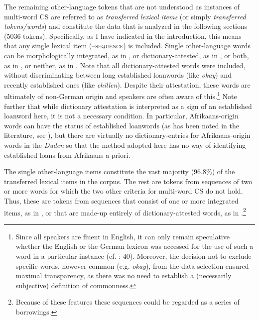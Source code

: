 \documentclass[output=paper]{langsci/langscibook}
\begin{document}
The remaining other-language tokens that are not understood as instances of multi-word CS are referred to as \textit{transferred} \textit{lexical} \textit{items} (or simply \textit{transferred} \textit{tokens/words}) and constitute the data that is analyzed in the following sections (5036 tokens). Specifically, as I have indicated in the introduction, this means that any single lexical item (–⁠\textsc{sequence}) is included. Single other-language words can be morphologically integrated, as in , or dictionary-attested, as in , or both, as in , or neither, as in . Note that all dictionary-attested words were included, without discriminating between long established loanwords (like \textit{okay}) and recently established ones (like \textit{chillen}). Despite their attestation, these words are ultimately of non-German origin and speakers are often aware of this.\footnote{Since all speakers are fluent in English, it can only remain speculative whether the English or the German lexicon was accessed for the use of such a word in a particular instance (cf. \citealt{haspelmath_lexical_2009}: 40). Moreover, the decision not to exclude specific words, however common (e.g. \textit{okay}), from the data selection ensured maximal transparency, as there was no need to establish a (necessarily subjective) definition of commonness.} Note further that while dictionary attestation is interpreted as a sign of an established loanword here, it is not a necessary condition. In particular, Afrikaans-origin words can have the status of established loanwords (as has been noted in the literature, see ), but there are virtually no dictionary-entries for Afrikaans-origin words in the \textit{Duden} so that the method adopted here has no way of identifying established loans from Afrikaans a priori.

The single other-language items constitute the vast majority (96.8\%) of the transferred lexical items in the corpus. The rest are tokens from sequences of two or more words for which the two other criteria for multi-word CS do not hold. Thus, these are tokens from sequences that consist of one or more integrated items, as in , or that are made-up entirely of dictionary-attested words, as in .\footnote{Because of these features these sequences could be regarded as a series of borrowings.}
\end{document}
